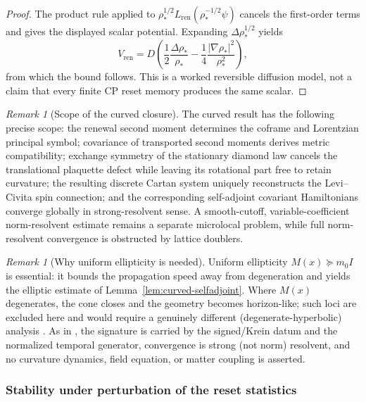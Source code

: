 \documentclass[11pt]{article}
\theoremstyle{definition}
\theoremstyle{remark}
\newtheorem{remark}[theorem]{Remark}
\begin{document}
\begin{proof}
The product rule applied to
\(\rho_*^{1/2}L_{\mathrm{ren}}(\rho_*^{-1/2}\psi)\) cancels the first-order
terms and gives the displayed scalar potential.  Expanding
\(\Delta\rho_*^{1/2}\) yields
\[
  V_{\mathrm{ren}}
  =D\left(
    \frac12\frac{\Delta\rho_*}{\rho_*}
    -\frac14\frac{|\nabla\rho_*|^2}{\rho_*^2}
  \right),
\]
from which the bound follows.  This is a worked reversible diffusion model,
not a claim that every finite CP reset memory produces the same scalar.
\end{proof}

\begin{remark}[Scope of the curved closure]
\label{rem:ordering}
The curved result has the following precise scope: the renewal second moment
determines the coframe and Lorentzian principal symbol; covariance of transported
second moments derives metric compatibility; exchange symmetry of the
stationary diamond law cancels the translational plaquette defect while leaving
its rotational part free to retain curvature; the resulting discrete Cartan
system uniquely reconstructs the Levi--Civita spin connection; and the
corresponding self-adjoint covariant Hamiltonians converge globally in
strong-resolvent sense.  A smooth-cutoff,
variable-coefficient norm-resolvent estimate remains a separate microlocal
problem, while full norm-resolvent convergence is obstructed by lattice
doublers.
\end{remark}

\begin{remark}[Why uniform ellipticity is needed]
\label{rem:ellipticity-needed}
Uniform ellipticity $M(x)\succeq m_0 I$ is essential: it bounds the propagation
speed away from degeneration and yields the elliptic estimate of
Lemma~\ref{lem:curved-selfadjoint}.  Where $M(x)$ degenerates, the cone closes and
the geometry becomes horizon-like; such loci are excluded here and would require
a genuinely different (degenerate-hyperbolic) analysis .  As in
, the signature is carried by the signed/Krein datum and the normalized temporal
generator, convergence is strong (not norm) resolvent, and no curvature dynamics, field
equation, or matter coupling is asserted.
\end{remark}

\subsubsection{Stability under perturbation of the reset statistics}
\end{document}
